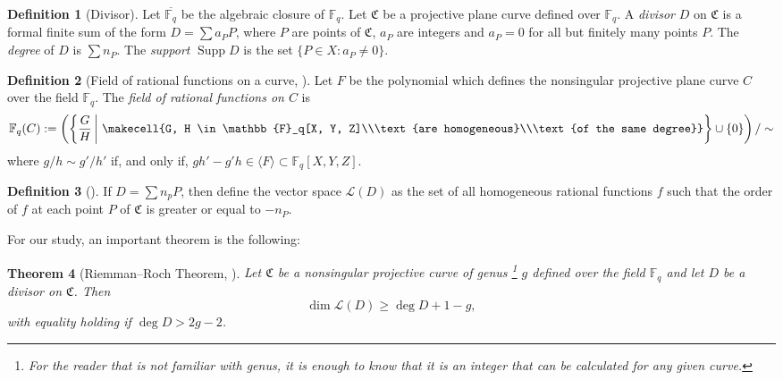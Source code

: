 \documentclass[11pt, oneside]{amsart}
\newtheorem{thm}{Theorem}[section]
\theoremstyle{definition}
\newtheorem{defn}[thm]{Definition}
\theoremstyle{remark}
\numberwithin{equation}{section}
\DeclareMathOperator{\Supp}{Supp}
\begin{document}
\begin{defn}[Divisor] 
	Let $\overline{\mathbb{F}_q}$ be the algebraic closure of $\mathbb{F}_q$.
	Let $\mathfrak C$ be a projective plane curve defined over $\mathbb{F}_q$.
	A \emph{divisor} $D$ on $\mathfrak C$ is a formal finite sum of the form $D = \sum a_P P$, where $P$ are points of $\mathfrak C$, $a_P$ are integers and $a_P = 0$ for all but finitely many points $P$.
	The \emph{degree} of $D$ is $\sum n_P$.
	The \emph{support} $\Supp D$ is the set $\{P \in X : a_P \neq 0\}$.
\end{defn}

\begin{defn}[Field of rational functions on a curve, \cite{Wal00}] %
	Let $F$ be the polynomial which defines the nonsingular projective plane curve $C$ over the field $\mathbb{F}_q$. The \emph{field of rational functions on $C$} is
	\begin{equation}
		\mathbb{F}_q(C) := \left(\left\{\frac{G}{H}\, \bigg|\,\, \makecell{G, H \in \mathbb{F}_q[X, Y, Z]\\\text{are homogeneous}\\\text{of the same degree}} \right\} \cup \{0\}\right) / \sim
	\end{equation}
	where $g/h \sim g'/h'$ if, and only if, $gh' - g'h \in \langle F \rangle \subset \mathbb{F}_q[X, Y, Z]$.
\end{defn}

\begin{defn}[\cite{LS87}]
	If $D = \sum n_p P$, then define the vector space $\mathcal L(D)$ as the set of all homogeneous rational functions $f$ such that the order of $f$ at each point $P$ of $\mathfrak C$ is greater or equal to $-n_P$.
\end{defn}

For our study, an important theorem is the following:
\begin{thm}[Riemman--Roch Theorem, \cite{Wal00}]
	Let $\mathfrak C$ be a nonsingular projective curve of genus%
	\footnote{For the reader that is not familiar with genus, it is enough to know that it is an integer that can be calculated for any given curve.}
	$g$ defined over the field $\mathbb{F}_q$ and let $D$ be a divisor on $\mathfrak C$.
	Then
	\begin{equation}
		\dim \mathcal L(D) \ge \deg D + 1 - g,
	\end{equation}
	with equality holding if $\deg D > 2g - 2$.
\end{thm}
\end{document}
